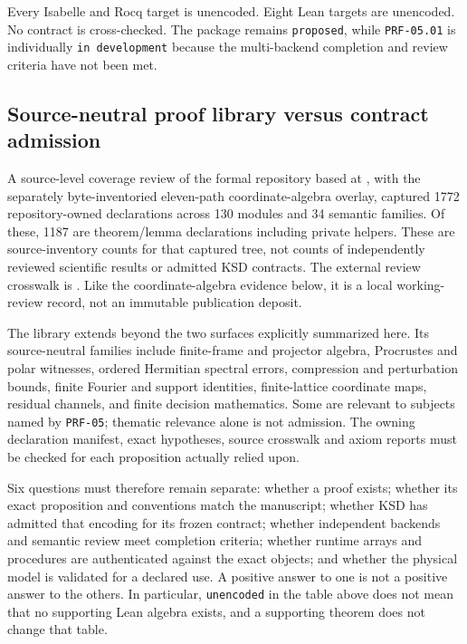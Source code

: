 Every Isabelle and Rocq target is unencoded. Eight Lean targets are unencoded.
No contract is cross-checked. The package remains \texttt{proposed}, while
\texttt{PRF-05.01} is individually \texttt{in development} because the
multi-backend completion and review criteria have not been met.


\subsection{Source-neutral proof library versus contract admission}
\label{sec:mechanization-library-versus-admission}

A source-level coverage review of the formal repository based at
, with the separately
byte-inventoried eleven-path coordinate-algebra overlay, captured 1772
repository-owned declarations across 130 modules and 34 semantic families.
Of these, 1187 are theorem/lemma declarations including private helpers.
These are source-inventory counts for that captured tree, not counts of
independently reviewed scientific results or admitted KSD contracts. The
external review crosswalk is
.
Like the coordinate-algebra evidence below, it is a local working-review
record, not an immutable publication deposit.

The library extends beyond the two surfaces explicitly summarized here.
Its source-neutral families include finite-frame and projector algebra,
Procrustes and polar witnesses, ordered Hermitian spectral errors,
compression and perturbation bounds, finite Fourier and support identities,
finite-lattice coordinate maps, residual channels, and finite decision
mathematics. Some are relevant to subjects named by \texttt{PRF-05}; thematic
relevance alone is not admission. The owning declaration manifest, exact
hypotheses, source crosswalk and axiom reports must be checked for each
proposition actually relied upon.

Six questions must therefore remain separate: whether a proof exists;
whether its exact proposition and conventions match the manuscript;
whether KSD has admitted that encoding for its frozen contract; whether
independent backends and semantic review meet completion criteria; whether
runtime arrays and procedures are authenticated against the exact objects;
and whether the physical model is validated for a declared use. A positive
answer to one is not a positive answer to the others. In particular,
\texttt{unencoded} in the table above does not mean that no supporting Lean
algebra exists, and a supporting theorem does not change that table.


